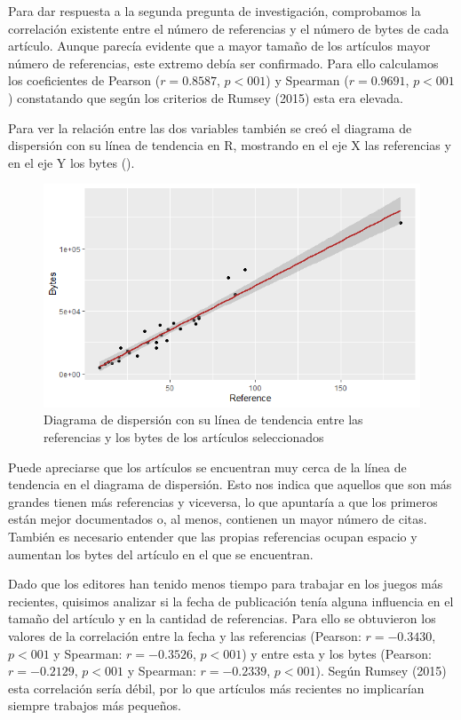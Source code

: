 \documentclass[spanish]{textolivre}
\begin{document}
Para dar respuesta a la segunda pregunta de investigación, comprobamos la correlación existente entre el número de referencias y el número de bytes de cada artículo. Aunque parecía evidente que a mayor tamaño de los artículos mayor número de referencias, este extremo debía ser confirmado. Para ello calculamos los coeficientes de Pearson ($r = 0.8587$, $p < 001$) y Spearman ($r = 0.9691$, $p < 001$) constatando que según los criterios de Rumsey (2015) esta era elevada.

Para ver la relación entre las dos variables también se creó el diagrama de dispersión con su línea de tendencia en R, mostrando en el eje X las referencias y en el eje Y los bytes ().

\begin{figure}[htbp]
\centering
\begin{minipage}{.85\textwidth}
 \includegraphics[width=\textwidth]{fig04.png}
 \caption{Diagrama de dispersión con su línea de tendencia entre las referencias y los bytes de los artículos seleccionados}
 \label{fig04}
\end{minipage}
\end{figure}

Puede apreciarse que los artículos se encuentran muy cerca de la línea de tendencia en el diagrama de dispersión. Esto nos indica que aquellos que son más grandes tienen más referencias y viceversa, lo que apuntaría a que los primeros están mejor documentados o, al menos, contienen un mayor número de citas. También es necesario entender que las propias referencias ocupan espacio y aumentan los bytes del artículo en el que se encuentran.

Dado que los editores han tenido menos tiempo para trabajar en los juegos más recientes, quisimos analizar si la fecha de publicación tenía alguna influencia en el tamaño del artículo y en la cantidad de referencias. Para ello se obtuvieron los valores de la correlación entre la fecha y las referencias (Pearson: $r = -0.3430$, $p < 001$ y Spearman: $r = -0.3526$, $p < 001$) y entre esta y los bytes (Pearson: $r = -0.2129$, $p < 001$ y Spearman: $r = -0.2339$, $p < 001$). Según Rumsey (2015) esta correlación sería débil, por lo que artículos más recientes no implicarían siempre trabajos más pequeños.
\end{document}
